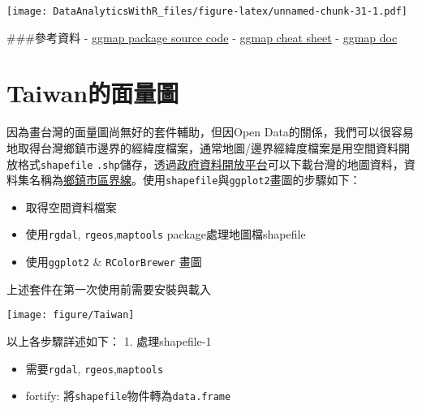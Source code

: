 \documentclass[
]{book}
\newenvironment{Shaded}{\begin{snugshade}}{\end{snugshade}}
\newcommand{\CommentTok}[1]{\textcolor[rgb]{0.56,0.35,0.01}{\textit{#1}}}
\newcommand{\DataTypeTok}[1]{\textcolor[rgb]{0.13,0.29,0.53}{#1}}
\newcommand{\DecValTok}[1]{\textcolor[rgb]{0.00,0.00,0.81}{#1}}
\newcommand{\KeywordTok}[1]{\textcolor[rgb]{0.13,0.29,0.53}{\textbf{#1}}}
\newcommand{\NormalTok}[1]{#1}
\newcommand{\OperatorTok}[1]{\textcolor[rgb]{0.81,0.36,0.00}{\textbf{#1}}}
\newcommand{\StringTok}[1]{\textcolor[rgb]{0.31,0.60,0.02}{#1}}
\providecommand{\tightlist}{%
  \setlength{\itemsep}{0pt}\setlength{\parskip}{0pt}}
\begin{document}
\texttt{[image: DataAnalyticsWithR\_files/figure-latex/unnamed-chunk-31-1.pdf]}

\#\#\#參考資料
- \href{https://github.com/dkahle/ggmap}{ggmap package source code}
- \href{https://www.nceas.ucsb.edu/~frazier/RSpatialGuides/ggmap/ggmapCheatsheet.pdf}{ggmap cheat sheet}
- \href{https://dl.dropboxusercontent.com/u/24648660/ggmap\%20useR\%202012.pdf}{ggmap doc}

\hypertarget{taiwanux7684ux9762ux91cfux5716}{%
\section{Taiwan的面量圖}\label{taiwanux7684ux9762ux91cfux5716}}

因為畫台灣的面量圖尚無好的套件輔助，但因Open Data的關係，我們可以很容易地取得台灣鄉鎮市邊界的經緯度檔案，通常地圖/邊界經緯度檔案是用空間資料開放格式\texttt{shapefile} \texttt{.shp}儲存，透過\href{http://data.gov.tw/}{政府資料開放平台}可以下載台灣的地圖資料，資料集名稱為\href{http://data.gov.tw/node/7441}{鄉鎮市區界線}。使用\texttt{shapefile}與\texttt{ggplot2}畫圖的步驟如下：

\begin{itemize}
\tightlist
\item
  取得空間資料檔案
\item
  使用\texttt{rgdal}, \texttt{rgeos},\texttt{maptools} package處理地圖檔shapefile
\item
  使用\texttt{ggplot2} \& \texttt{RColorBrewer} 畫圖
\end{itemize}

上述套件在第一次使用前需要安裝與載入

\texttt{[image: figure/Taiwan]}

以上各步驟詳述如下：
1. 處理shapefile-1

\begin{itemize}
\tightlist
\item
  需要\texttt{rgdal}, \texttt{rgeos},\texttt{maptools}
\item
  fortify: 將\texttt{shapefile}物件轉為\texttt{data.frame}
\end{itemize}

\begin{Shaded}
\end{Shaded}
\end{document}
